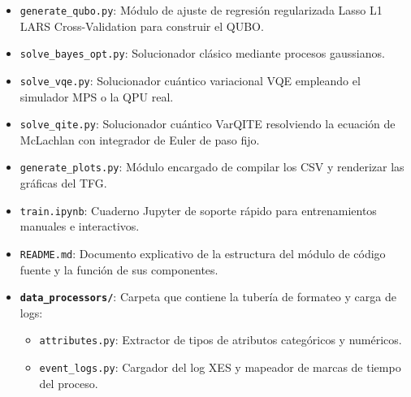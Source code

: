 \begin{itemize}
\begin{itemize}
        \item \texttt{generate\_qubo.py}: Módulo de ajuste de regresión regularizada Lasso L1 LARS Cross-Validation para construir el QUBO.
        \item \texttt{solve\_bayes\_opt.py}: Solucionador clásico mediante procesos gaussianos.
        \item \texttt{solve\_vqe.py}: Solucionador cuántico variacional VQE empleando el simulador MPS o la QPU real.
        \item \texttt{solve\_qite.py}: Solucionador cuántico VarQITE resolviendo la ecuación de McLachlan con integrador de Euler de paso fijo.
        \item \texttt{generate\_plots.py}: Módulo encargado de compilar los CSV y renderizar las gráficas del TFG.
        \item \texttt{train.ipynb}: Cuaderno Jupyter de soporte rápido para entrenamientos manuales e interactivos.
        \item \texttt{README.md}: Documento explicativo de la estructura del módulo de código fuente y la función de sus componentes.
        \item \textbf{\texttt{data\_processors/}}: Carpeta que contiene la tubería de formateo y carga de logs:
        \begin{itemize}
            \item \texttt{attributes.py}: Extractor de tipos de atributos categóricos y numéricos.
            \item \texttt{event\_logs.py}: Cargador del log XES y mapeador de marcas de tiempo del proceso.
        \end{itemize}
    \end{itemize}


\end{itemize}
